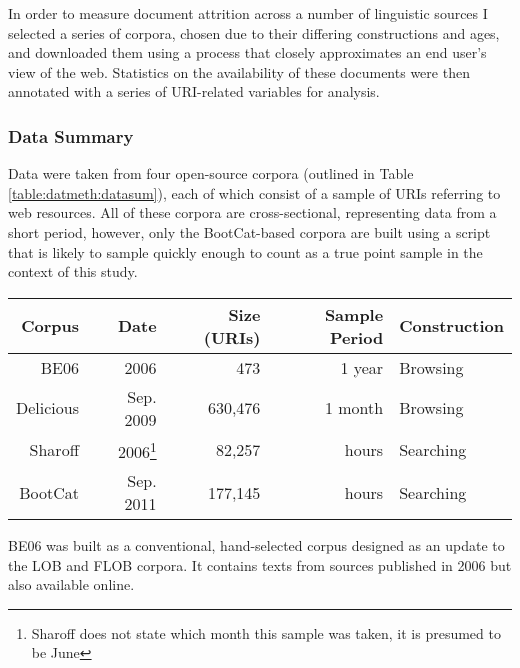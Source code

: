 In order to measure document attrition across a number of linguistic sources I selected a series of corpora, chosen due to their differing constructions and ages, and downloaded them using a process that closely approximates an end user's view of the web.  Statistics on the availability of these documents were then annotated with a series of URI-related variables for analysis.




\subsubsection{Data Summary}
Data were taken from four open-source corpora (outlined in Table \ref{table:datmeth:datasum}), each of which consist of a sample of URIs referring to web resources.  All of these corpora are cross-sectional, representing data from a short period, however, only the BootCat-based corpora are built using a script that is likely to sample quickly enough to count as a true point sample in the context of this study.

\begin{table*}[ht!]
    \centering
    \begin{tabular}{r | r | r | r | l  }
    Corpus    & Date	    & Size (URIs)   & Sample Period	& Construction \\ 
    \hline
    BE06      & 2006	    & 473	    & 1 year		&  Browsing \\ 
    Delicious & Sep. 2009   & 630,476	    & 1 month		&  Browsing \\
    Sharoff   & 2006\footnote{Sharoff does not state which month this sample was taken, it is presumed to be June}	    
                            & 82,257	    & hours		&  Searching \\
    BootCat  & Sep. 2011   & 177,145	    & hours		&  Searching \\ 
    \end{tabular}

    \caption{An overview of the corpora selected for study.}
    \label{table:datmeth:datasum}
\end{table*}

BE06\cite{baker2009be06} 
was built as a conventional, hand-selected corpus designed as an update to the LOB\cite{johansson1980lob} and FLOB\cite{hundt1998manual} corpora.  It contains texts from sources published in 2006 but also available online.

